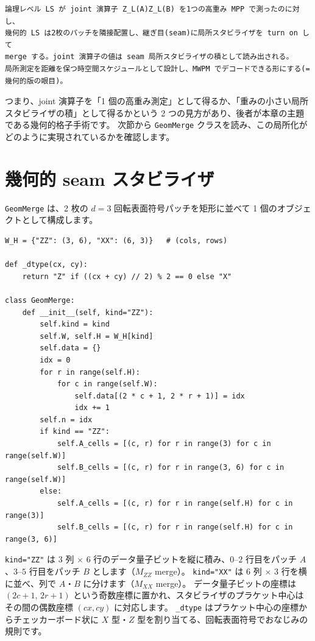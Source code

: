 \begin{lstlisting}[caption={幾何的 LS の狙い（src/stages/01\_mpp/src/ftqc/geom\_lattice\_surgery.py 冒頭コメント）}]
論理レベル LS が joint 演算子 Z_L(A)Z_L(B) を1つの高重み MPP で測ったのに対し、
幾何的 LS は2枚のパッチを隣接配置し、継ぎ目(seam)に局所スタビライザを turn on して
merge する。joint 演算子の値は seam 局所スタビライザの積として読み出される。
局所測定を距離を保つ時空間スケジュールとして設計し、MWPM でデコードできる形にする(=幾何的版の眼目)。
\end{lstlisting}

つまり、joint 演算子を「1 個の高重み測定」として得るか、「重みの小さい局所スタビライザの積」として得るかという 2 つの見方があり、後者が本章の主題である幾何的格子手術です。
次節から \texttt{GeomMerge} クラスを読み、この局所化がどのように実現されているかを確認します。

\section{幾何的 seam スタビライザ}\label{sec:seam}

\texttt{GeomMerge} は、2 枚の $d=3$ 回転表面符号パッチを矩形に並べて 1 個のオブジェクトとして構成します。

\begin{lstlisting}[caption={矩形レイアウトの生成（src/stages/01\_mpp/src/ftqc/geom\_lattice\_surgery.py）}]
W_H = {"ZZ": (3, 6), "XX": (6, 3)}   # (cols, rows)

def _dtype(cx, cy):
    return "Z" if ((cx + cy) // 2) % 2 == 0 else "X"

class GeomMerge:
    def __init__(self, kind="ZZ"):
        self.kind = kind
        self.W, self.H = W_H[kind]
        self.data = {}
        idx = 0
        for r in range(self.H):
            for c in range(self.W):
                self.data[(2 * c + 1, 2 * r + 1)] = idx
                idx += 1
        self.n = idx
        if kind == "ZZ":
            self.A_cells = [(c, r) for r in range(3) for c in range(self.W)]
            self.B_cells = [(c, r) for r in range(3, 6) for c in range(self.W)]
        else:
            self.A_cells = [(c, r) for r in range(self.H) for c in range(3)]
            self.B_cells = [(c, r) for r in range(self.H) for c in range(3, 6)]
\end{lstlisting}

\texttt{kind="ZZ"} は 3 列 $\times$ 6 行のデータ量子ビットを縦に積み、$0$–$2$ 行目をパッチ $A$、$3$–$5$ 行目をパッチ $B$ とします（$M_{ZZ}$ merge）。
\texttt{kind="XX"} は 6 列 $\times$ 3 行を横に並べ、列で $A$・$B$ に分けます（$M_{XX}$ merge）。
データ量子ビットの座標は $(2c+1,\,2r+1)$ という奇数座標に置かれ、スタビライザのプラケット中心はその間の偶数座標 $(cx,cy)$ に対応します。
\texttt{\_dtype} はプラケット中心の座標からチェッカーボード状に $X$ 型・$Z$ 型を割り当てる、回転表面符号でおなじみの規則です。

